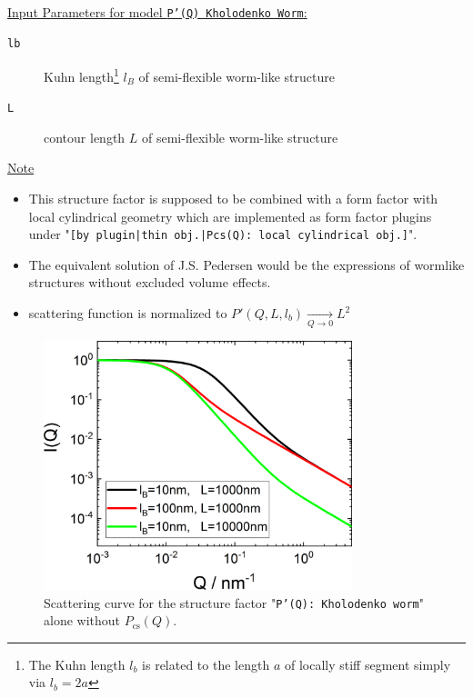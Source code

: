 \vspace{5mm}

\hspace{1pt}\\
\uline{Input Parameters for model \texttt{P'(Q) Kholodenko Worm}:}\\
\begin{description}
\item[\texttt{lb}] Kuhn length\footnote{The Kuhn length $l_b$ is related to the length $a$ of
    locally stiff segment simply via $l_b=2a$} $l_B$ of semi-flexible worm-like structure
\item[\texttt{L}] contour length $L$ of semi-flexible worm-like structure
\end{description}

\noindent
\uline{Note}
\begin{itemize}
  \item This structure factor is supposed to be combined with a form factor with local cylindrical geometry which are implemented as form factor plugins
under "\texttt{[by plugin|thin obj.|Pcs(Q): local cylindrical obj.]}".
\item The equivalent solution of J.S. Pedersen \cite{Pedersen96Macrom} would be the expressions of wormlike structures without excluded volume effects.
  \item scattering function is normalized to $P'(Q,L,l_b) \xrightarrow[Q\rightarrow 0]{} L^2$
\end{itemize}

\begin{figure}[htb]
\begin{center}
\includegraphics[width=0.8\textwidth]{../images/form_factor/polymer_semiflexible/PprimeKholodenkoWorm.png}
\end{center}
\caption{Scattering curve for the structure factor "\texttt{P'(Q): Kholodenko worm}" alone without $P_\mathrm{cs}(Q)$.}
\label{fig_IQ:PprimeKholodenkoWorm}
\end{figure}

